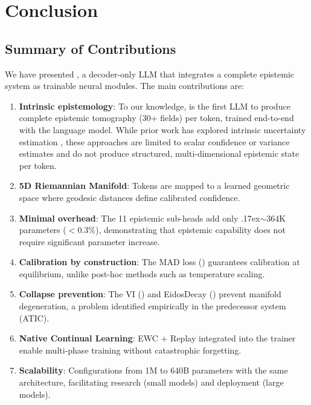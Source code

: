 
\section{Conclusion}
\label{sec:conclusion}

\subsection{Summary of Contributions}

We have presented \aletheion{}, a decoder-only LLM that integrates a
complete epistemic system as trainable neural modules. The main
contributions are:

\begin{enumerate}
    \item \textbf{Intrinsic epistemology}: To our knowledge, \aletheion{}
    is the first LLM to produce complete epistemic tomography (30+ fields)
    per token, trained end-to-end with the language model. While prior work
    has explored intrinsic uncertainty estimation \cite{gal2016dropout,
    lakshminarayanan2017simple}, these approaches are limited to scalar
    confidence or variance estimates and do not produce structured,
    multi-dimensional epistemic state per token.

    \item \textbf{5D Riemannian Manifold}: Tokens are mapped to a
    learned geometric space where geodesic distances define calibrated
    confidence.

    \item \textbf{Minimal overhead}: The 11 epistemic sub-heads add
    only {\raise.17ex\hbox{$\scriptstyle\sim$}}364K parameters ($<$0.3\%),
    demonstrating that epistemic capability does not require significant
    parameter increase.

    \item \textbf{Calibration by construction}: The MAD loss
    () guarantees calibration at equilibrium,
    unlike post-hoc methods such as temperature scaling.

    \item \textbf{Collapse prevention}: The VI () and
    EidosDecay () prevent manifold degeneration, a
    problem identified empirically in the predecessor system (ATIC).

    \item \textbf{Native Continual Learning}: EWC + Replay integrated
    into the trainer enable multi-phase training without catastrophic
    forgetting.

    \item \textbf{Scalability}: Configurations from 1M to 640B
    parameters with the same architecture, facilitating research
    (small models) and deployment (large models).
\end{enumerate}

